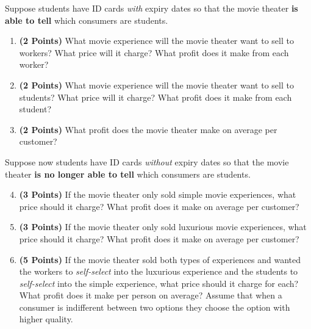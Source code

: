 \documentclass[11pt]{article}
\newcounter{question}[section]
\newenvironment{subquestions}{
  \begin{enumerate}[label=(\roman*)]}{\end{enumerate}}
\begin{document}
Suppose students have ID cards \emph{with} expiry dates so that the movie theater \textbf{is able to tell} which consumers are students.
\begin{subquestions}
  \item \textbf{(2 Points)} What movie experience will the movie theater want to sell to workers? What price will it charge? What profit does it make from each worker?
  \item \textbf{(2 Points)} What movie experience will the movie theater want to sell to students? What price will it charge? What profit does it make from each student?
  \item \textbf{(2 Points)} What profit does the movie theater make on average per customer?
\end{subquestions}
Suppose now students have ID cards \emph{without} expiry dates so that the movie theater \textbf{is no longer able to tell} which consumers are students.
\begin{subquestions}
  \setcounter{enumi}{3}
\item \textbf{(3 Points)} If the movie theater only sold simple movie experiences, what price should it charge? What profit does it make on average per customer?
\item \textbf{(3 Points)} If the movie theater only sold luxurious movie experiences, what price should it charge? What profit does it make on average per customer?
\item \textbf{(5 Points)} If the movie theater sold both types of experiences and wanted the workers to \emph{self-select} into the luxurious experience and the students to \emph{self-select} into the simple experience, what price should it charge for each? What profit does it make per person on average? Assume that when a consumer is indifferent between two options they choose the option with higher quality.
\end{subquestions}
\end{document}
